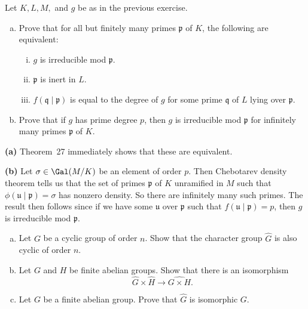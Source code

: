 \documentclass[11pt,letterpaper]{article}
\begin{document}
\begin{cproblem}{7.14}
    Let $K, L, M,$ and $g$ be as in the previous exercise.
    \begin{enumerate}[(a)]
        \item Prove that for all but finitely many primes $\mathfrak{p}$ of $K$, the following are equivalent:
            \begin{enumerate}[(i)]
                \item $g$ is irreducible mod $\mathfrak{p}$.
                \item $\mathfrak{p}$ is inert in $L$.
                \item $f(\mathfrak{q}\mid \mathfrak{p})$ is equal to the degree of $g$ for some prime $ \mathfrak{q}$ of $L$ lying over $\mathfrak{p}$.
            \end{enumerate}
        \item Prove that if $g$ has prime degree $p$, then $g$ is irreducible mod $ \mathfrak{p}$ for infinitely many primes $\mathfrak{p}$ of $K$. %
    \end{enumerate}
\end{cproblem}

\begin{solution}
    \textbf{(a)} Theorem~27 immediately shows that these are equivalent.

    \textbf{(b)} Let $\sigma\in \Gal(M/K)$ be an element of order $p$. Then Chebotarev density theorem tells us that the set of primes $\mathfrak{p}$ of $K$ unramified in $M$ such that $\phi(\mathfrak{u}\mid \mathfrak{p})=\sigma$ has nonzero density. So there are infinitely many such primes. The result then follows since if we have some $\mathfrak{u}$ over $\mathfrak{p}$ such that $f(\mathfrak{u}\mid \mathfrak{p})=p$, then $g$ is irreducible mod $\mathfrak{p}$.
\end{solution}

\begin{cproblem}{7.15}\noindent
    \begin{enumerate}[(a)]
        \item Let $G$ be a cyclic group of order $n$. Show that the character group $\widehat{G}$ is also cyclic of order $n$.
        \item Let $G$ and $H$ be finite abelian groups. Show that there is an isomorphism
            \[
                \widehat{G} \times \widehat{H} \to \widehat{G\times H}.
            \] 
        \item Let $G$ be a finite abelian group. Prove that $\widehat{G}$ is isomorphic $G$. %
    \end{enumerate}
\end{cproblem}
\end{document}
